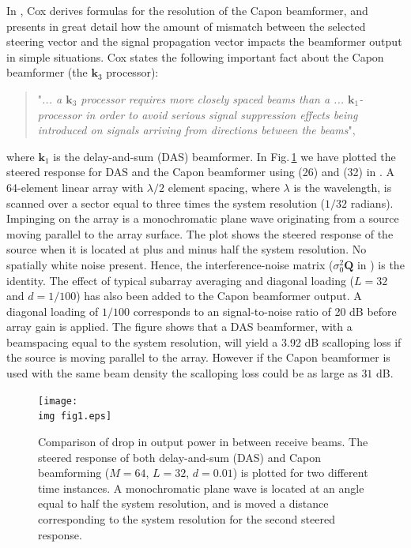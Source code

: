 \documentclass[journal]{IEEEtran}
\newcommand{\mat}[1]{\mathbf{#1}}
\renewcommand{\vec}[1]{\mathbf{#1}}
\newcommand{\img}{img/}
\begin{document}
In \cite{Cox1973}, Cox derives formulas for the resolution of the Capon beamformer, and presents in great detail how the amount of mismatch between the selected steering vector and the signal propagation vector impacts the beamformer output in simple situations. Cox states the following important fact about the Capon beamformer (the $\vec{k}_3$ processor): 
\begin{quote}
"\textit{... a $\vec{k}_3$ processor requires more closely spaced beams than a ... $\vec{k}_1$-processor in order to avoid serious signal suppression effects being introduced on signals arriving from directions between the beams}", 
\end{quote}
where $\vec{k}_1$ is the delay-and-sum (DAS) beamformer. In Fig.\,\ref{fig:das_capon_beams} we have plotted the steered response for DAS and the Capon beamformer using (26) and (32) in \cite{Cox1973}. A 64-element linear array with $\lambda/2$ element spacing, where $\lambda$ is the wavelength, is scanned over a sector equal to three times the system resolution ($1/32$ radians). Impinging on the array is a monochromatic plane wave originating from a source moving parallel to the array surface. The plot shows the steered response of the source when it is located at plus and minus half the system resolution. No spatially white noise present. Hence, the interference-noise matrix ($\sigma_0^2\mat{Q}$ in \cite{Cox1973}) is the identity. The effect of typical subarray averaging and diagonal loading ($L=32$ and $d=1/100$) has also been added to the Capon beamformer output. A diagonal loading of $1/100$ corresponds to an signal-to-noise ratio of 20 dB before array gain is applied. The figure shows that a DAS beamformer, with a beamspacing equal to the system resolution, will yield a 3.92 dB scalloping loss \cite{Harris1978} if the source is moving parallel to the array. However if the Capon beamformer is used with the same beam density the scalloping loss could be as large as $31$ dB.

\begin{figure}[!t]
\centerline{
\texttt{[image: \\img fig1.eps]}
}
\caption{Comparison of drop in output power in between receive beams. The steered response of both delay-and-sum (DAS) and Capon beamforming ($M=64$, $L=32$, $d=0.01$) is plotted for two different time instances. A monochromatic plane wave is located at an angle equal to half the system resolution, and is moved a distance corresponding to the system resolution for the second steered response.}
\label{fig:das_capon_beams}
\end{figure}
\end{document}
